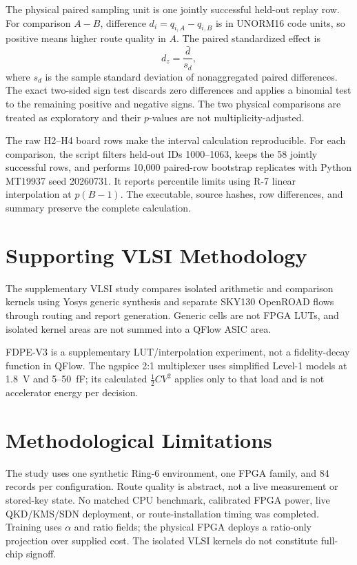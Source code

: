 The physical paired sampling unit is one jointly successful held-out replay row.
For comparison $A-B$, difference $d_i=q_{i,A}-q_{i,B}$ is in UNORM16 code units, so
positive means higher route quality in $A$. The paired standardized effect is
\begin{equation}
d_z=\frac{\bar d}{s_d},
\label{eq:paired-dz}
\end{equation}
where $s_d$ is the sample standard deviation of nonaggregated paired differences.
The exact two-sided sign test discards zero differences and applies a binomial test
to the remaining positive and negative signs. The two physical comparisons are
treated as exploratory and their $p$-values are not multiplicity-adjusted.

The raw H2--H4 board rows make the interval calculation reproducible. For each
comparison, the script filters held-out IDs 1000--1063, keeps the 58 jointly
successful rows, and performs 10,000 paired-row bootstrap replicates with Python
MT19937 seed 20260731. It reports percentile limits using R-7 linear interpolation
at $p(B-1)$. The executable, source hashes, row differences, and summary preserve
the complete calculation.

\section{Supporting VLSI Methodology}

The supplementary VLSI study compares isolated arithmetic and comparison kernels
using Yosys generic synthesis and separate SKY130 OpenROAD flows through routing and
report generation. Generic cells are not FPGA LUTs, and isolated kernel areas are
not summed into a QFlow ASIC area.

FDPE-V3 is a supplementary LUT/interpolation experiment, not a fidelity-decay
function in QFlow. The ngspice 2:1 multiplexer uses simplified Level-1 models at
1.8~V and 5--50~fF; its calculated $\tfrac12CV^2$ applies only to that load and is
not accelerator energy per decision.

\section{Methodological Limitations}

The study uses one synthetic Ring-6 environment, one FPGA family, and 84 records per
configuration. Route quality is abstract, not a live measurement or stored-key
state. No matched CPU benchmark, calibrated FPGA power, live QKD/KMS/SDN deployment,
or route-installation timing was completed. Training uses $\alpha$ and ratio fields;
the physical FPGA deploys a ratio-only projection over supplied cost. The isolated
VLSI kernels do not constitute full-chip signoff.

